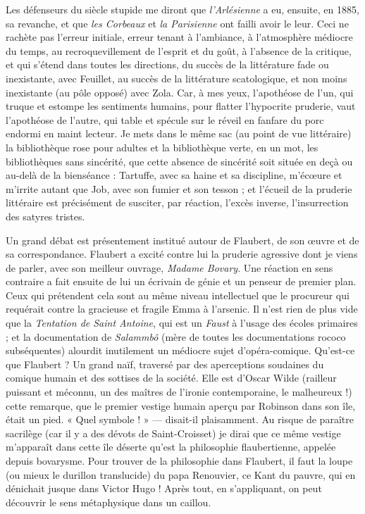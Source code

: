 \documentclass[french,twoside]{book} %
\begin{document}
Les défenseurs du siècle stupide me diront que {\itshape l’Arlésienne} a eu, ensuite, en 1885, sa revanche, et que {\itshape les Corbeaux} et {\itshape la Parisienne} ont failli avoir le leur. Ceci ne rachète pas l’erreur initiale, erreur tenant à l’ambiance, à l’atmosphère médiocre du temps, au recroquevillement de l’esprit et du goût, à l’absence de la critique, et qui s’étend dans toutes les directions, du succès de la littérature fade ou inexistante, avec Feuillet, au succès de la littérature scatologique, et non moins inexistante (au pôle opposé) avec Zola. Car, à mes yeux, l’apothéose de l’un, qui truque et estompe les sentiments humains, pour flatter l’hypocrite pruderie, vaut l’apothéose de l’autre, qui table et spécule sur le réveil en fanfare du porc endormi en maint lecteur. Je mets dans le même sac (au point de vue littéraire) la bibliothèque rose pour adultes et la bibliothèque verte, en un mot, les bibliothèques sans sincérité, que cette absence de sincérité soit située en deçà ou au-delà de la bienséance : Tartuffe, avec sa haine et sa discipline, m’écœure et m’irrite autant que Job, avec son fumier et son tesson ; et l’écueil de la pruderie littéraire est précisément de susciter, par réaction, l’excès inverse, l’insurrection des satyres tristes.\par
Un grand débat est présentement institué autour de Flaubert, de son œuvre et de sa correspondance. Flaubert a excité contre lui la pruderie agressive dont je viens de parler, avec son meilleur ouvrage, {\itshape Madame Bovary}. Une réaction en sens contraire a fait ensuite de lui un écrivain de génie et un penseur de premier plan. Ceux qui prétendent cela sont au même niveau intellectuel que le procureur qui requérait contre la gracieuse et fragile Emma à l’arsenic. Il n’est rien de plus vide que la {\itshape Tentation de Saint Antoine}, qui est un {\itshape Faust} à l’usage des écoles primaires ; et la documentation de {\itshape Salammbô} (mère de toutes les documentations rococo subséquentes) alourdit inutilement un médiocre sujet d’opéra-comique. Qu’est-ce que Flaubert ? Un grand naïf, traversé par des aperceptions soudaines du comique humain et des sottises de la société. Elle est d’Oscar Wilde (railleur puissant et méconnu, un des maîtres de l’ironie contemporaine, le malheureux !) cette remarque, que le premier vestige humain aperçu par Robinson dans son île, était un pied. « Quel symbole ! » — disait-il plaisamment. Au risque de paraître sacrilège (car il y a des dévots de Saint-Croisset) je dirai que ce même vestige m’apparaît dans cette île déserte qu’est la philosophie flaubertienne, appelée depuis bovarysme. Pour trouver de la philosophie dans Flaubert, il faut la loupe (ou mieux le durillon translucide) du papa Renouvier, ce Kant du pauvre, qui en dénichait jusque dans Victor Hugo ! Après tout, en s’appliquant, on peut découvrir le sens métaphysique dans un caillou.\par
\end{document}

